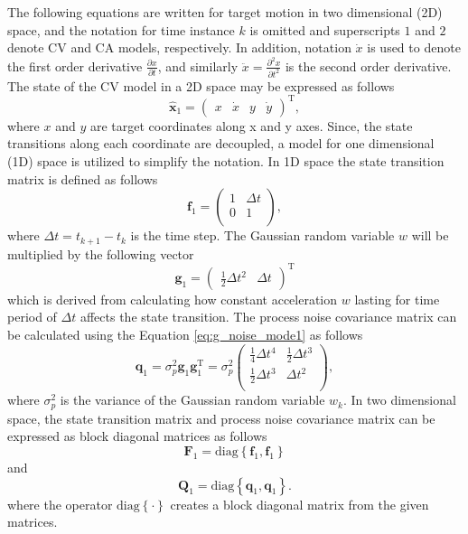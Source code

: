 \documentclass[english, 12pt, a4paper, elec, utf8, a-1b, online]{aaltothesis}
\renewcommand{\vec}[1]{\mathbf{#1}}
\newcommand{\transpose}[1]{#1^\text{T}}
\newcommand{\dt}{\Delta t}
\newcommand{\diag}[1]{\text{diag}\left\{ #1 \right\}}
\begin{document}
The following equations are written for target motion in two dimensional (2D) space, and
the notation for time instance $k$ is omitted and superscripts $1$ and $2$ denote CV and CA models, respectively. 
In addition, notation $\dot{x}$ is used to denote the first order derivative $\frac{\partial x}{\partial t}$, and similarly $\ddot{x}=\frac{\partial^2 x}{\partial t^2}$ is the second order derivative.
The state of the CV model in a 2D space may be expressed as follows
\begin{equation}\label{eq:x_mode1}
    \hat{\mathbf{x}}_1 =
        \transpose{
        \begin{pmatrix}
            x & \dot{x} & y & \dot{y}
    \end{pmatrix}},
\end{equation}
where $x$ and $y$ are target coordinates along x and y axes. 
Since, the state transitions along each coordinate are decoupled, a model for one dimensional (1D) space is utilized to simplify the notation.
In 1D space the state transition matrix is defined as follows
\begin{equation}\label{eq:f_mode1}
    \vec{f}_1 =
    \begin{pmatrix}
        1 & \dt \\
        0 & 1  \\
    \end{pmatrix},
\end{equation}
where $\dt=t_{k+1} - t_k$ is the time step.
The Gaussian random variable $w$ will be multiplied by the following vector
\begin{equation}\label{eq:g_noise_mode1}
\vec{g}_1 =\transpose{\begin{pmatrix}
        \frac{1}{2} \dt^2 & \dt
    \end{pmatrix}}
\end{equation}
which is derived from calculating how constant acceleration $w$ lasting for time period of $\dt$ affects the state transition.
The process noise covariance matrix can be calculated using the Equation \eqref{eq:g_noise_mode1} as follows  
\begin{equation}
    \vec{q}_1 = \sigma_p^2 \vec{g}_1 \transpose{\vec{g}_1}
    = \sigma_p^2
    \begin{pmatrix}
        \frac{1}{4} \dt^4 & \frac{1}{2} \dt^3 \\ 
        \frac{1}{2} \dt^3 & \dt^2 \\ 
    \end{pmatrix},
\end{equation}
where $\sigma_p^2$ is the variance of the Gaussian random variable $w_k$.
In two dimensional space, the state transition matrix and process noise covariance matrix can be expressed as block diagonal matrices as follows 
\begin{equation}\label{eq:F_mode1}
\vec{F}_1 = \diag{\vec{f}_1, \vec{f}_1}
\end{equation}
and
\begin{equation}
    \vec{Q}_1 = \diag{\vec{q}_1, \vec{q}_1}.
\end{equation}
where the operator $\diag{\cdot}$ creates a block diagonal matrix from the given matrices.
\end{document}
